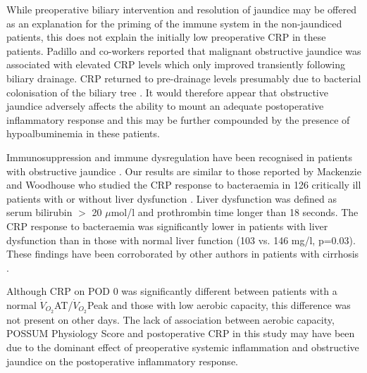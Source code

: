 While preoperative biliary intervention and resolution of jaundice may be offered as an explanation for the priming of the immune system in the non-jaundiced patients, this does not explain the initially low preoperative CRP in these patients.
Padillo and co-workers reported that malignant obstructive jaundice was associated with elevated CRP levels which only improved transiently following biliary drainage.
CRP returned to pre-drainage levels presumably due to bacterial colonisation of the biliary tree \parencite{padillo_effect_2002, padillo_cytokines_2001}.
It would therefore appear that obstructive jaundice adversely affects the ability to mount an adequate postoperative inflammatory response and this may be further compounded by the presence of hypoalbuminemia in these patients.

Immunosuppression and immune dysregulation have been recognised in patients with obstructive jaundice \parencite{scott-conner_pathophysiology_1994}.
Our results are similar to those reported by Mackenzie and Woodhouse who studied the CRP response to bacteraemia in 126 critically ill patients with or without liver dysfunction \parencite{mackenzie_c-reactive_2006}. 
Liver dysfunction was defined as serum bilirubin $>$ 20 $\mu$mol/l and prothrombin time longer than 18 seconds. 
The CRP response to bacteraemia was significantly lower in patients with liver dysfunction than in those with normal liver function (103 vs. 146 mg/l, p=0.03). 
These findings have been corroborated by other authors in patients with cirrhosis \parencite{pieri_c-reactive_2014, janum_c-reactive_2011}.

Although CRP on POD 0 was significantly different between patients with a normal $\dot{V}_{O_2}$AT/$\dot{V}_{O_2}$Peak and those with low aerobic capacity, this difference was not present on other days. 
The lack of association between aerobic capacity, POSSUM Physiology Score and postoperative CRP in this study may have been due to the dominant effect of preoperative systemic inflammation and obstructive jaundice on the postoperative inflammatory response.


